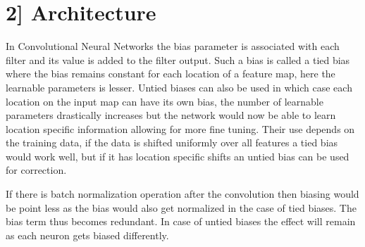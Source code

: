 \documentclass{article}
\begin{document}
\section*{2] Architecture}

In Convolutional Neural Networks the bias parameter is associated with each filter and its value is added to the filter output.
Such a bias is called a tied bias where the bias remains constant for each location of a feature map, here the learnable parameters is lesser. Untied biases can also be used 
in which case each location on the input map can have its own bias, the number of learnable parameters drastically increases but the network 
would now be able to learn location specific information allowing for more fine tuning. Their use depends on the training data, if the data is shifted uniformly over all features a tied bias would work well,
but if it has location specific shifts an untied bias can be used for correction.

If there is batch normalization operation after the convolution then biasing would be point less as the bias would also get normalized in the case of tied biases.
The bias term thus becomes redundant. In case of untied biases the effect will remain as each neuron gets biased differently.
\end{document}
